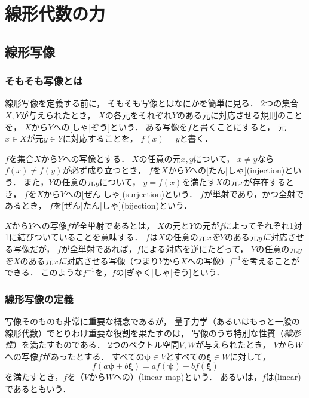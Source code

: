 \documentclass[
]{sotsu}
\newcommand{\bpsi}{\symbf{\psi}}
\newcommand{\bxi}{\symbf{\xi}}
\newcommand{\fire}[1]{\textcolor{fire}{#1}}
\newcommand{\water}[1]{\textcolor{water}{#1}}
\begin{document}
\section{線形代数の力}

\subsection{線形写像}

\subsubsection{そもそも写像とは}

\quad
線形写像を定義する前に，
そもそも写像とはなにかを簡単に見る．
2つの集合$X, Y$が与えられたとき，
$X$の各元をそれぞれ$Y$のある元に対応させる規則のことを，
$X$から$Y$への[しゃ|ぞう]という．
ある写像を$f$と書くことにすると，
元$x \in X$が元$y \in Y$に対応することを，
$f(x) = y$と書く．

$f$を集合$X$から$Y$への写像とする．
$X$の任意の元$x, y$について，
$x \neq y$なら$f(x) \neq f(y)$が必ず成り立つとき，
$f$を$X$から$Y$への[たん|しゃ](injection)という．
また，$Y$の任意の元$y$について，
$y = f(x)$を満たす$X$の元$x$が存在するとき，
$f$を$X$から$Y$への[ぜん|しゃ](surjection)という．
$f$が単射であり，かつ全射であるとき，
$f$を[ぜん|たん|しゃ](bijection)という．

$X$から$Y$への写像$f$が全単射であるとは，
$X$の元と$Y$の元が$f$によってそれぞれ1対1に結びついていることを意味する．
$f$は\fire{$X$の任意の元$x$\emph{を}}\water{$Y$のある元$y$\emph{に}}対応させる写像だが，
$f$が全単射であれば，$f$による対応を逆にたどって，
\water{$Y$の任意の元$y$\emph{を}}\fire{$X$のある元$x$\emph{に}}対応させる写像（つまり$Y$から$X$への写像）$f^{-1}$を考えることができる．
このような$f^{-1}$を，$f$の[ぎゃく|しゃ|ぞう]という．


\subsubsection{線形写像の定義}

写像そのものも非常に重要な概念であるが，
量子力学（あるいはもっと一般の線形代数）でとりわけ重要な役割を果たすのは，
写像のうち特別な性質（\emph{線形性}）を満たすものである．
2つのベクトル空間$V, W$が与えられたとき，
$V$から$W$への写像$f$があったとする．
すべての$\bpsi \in V$とすべての$\bxi \in W$に対して，
\begin{equation}
    \label{eq:linear-map}
    f(a \bpsi + b \bxi)
        = a f(\bpsi) + b f(\bxi)
\end{equation}
を満たすとき，$f$を（$V$から$W$への）(linear map)という．
あるいは，$f$は(linear)であるともいう．
\end{document}

